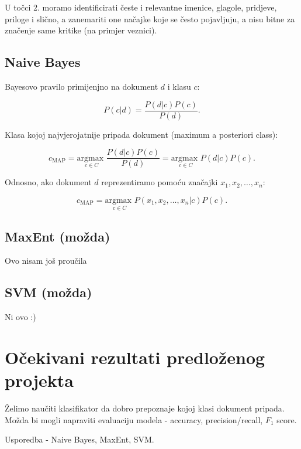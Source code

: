 \documentclass[12pt,a4paper,titlepage]{article}
\begin{document}
U točci 2. moramo identificirati česte i relevantne imenice, glagole, pridjeve, priloge i slično, a zanemariti one načajke koje se često pojavljuju, a nisu bitne za značenje same kritike (na primjer veznici).
\subsection{Naive Bayes}

Bayesovo pravilo primijenjno na dokument $d$ i klasu $c$:

\[P(c|d) = \frac{P(d|c)P(c)}{P(d)}.\]

Klasa kojoj najvjerojatnije pripada dokument (maximum a posteriori class):

\[c_{\text{MAP}} = \underset{{c \in C}}{\text{argmax }} \frac{P(d|c)P(c)}{P(d)}
= \underset{{c \in C}}{\text{argmax }} P(d|c)P(c).\] 

Odnosno, ako dokument $d$ reprezentiramo pomoću značajki $x_1, x_2, \ldots, x_n$:

\[c_{\text{MAP}} = \underset{{c \in C}}{\text{argmax }} P(x_1, x_2, \ldots, x_n|c)P(c).\] 

\subsection{MaxEnt (možda)}

Ovo nisam još proučila

\subsection{SVM (možda)}

Ni ovo :)

\section{Očekivani rezultati predloženog projekta}

Želimo naučiti klasifikator da dobro prepoznaje kojoj klasi dokument pripada. Možda bi mogli napraviti evaluaciju modela - accuracy, precision/recall, $F_1$ score.

Usporedba - Naive Bayes, MaxEnt, SVM.

\newpage

\nocite{*}



\end{document}
